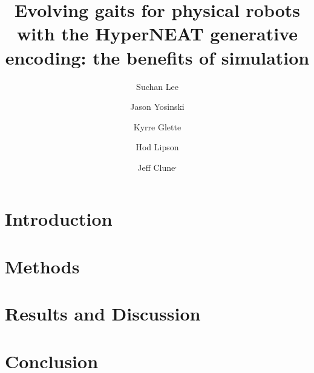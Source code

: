 \documentclass{llncs}
\begin{document}
%
\title{Evolving gaits for physical robots with the HyperNEAT generative encoding: the benefits of simulation}

\author{Suchan Lee \and Jason Yosinski \and Kyrre Glette \and Hod Lipson \and Jeff Clune$^,$ }
\maketitle
%
%
%
%
\begin{abstract}

\end{abstract}
%
%


\section{Introduction}

%
%
\section{Methods}








%
%
\section{Results and Discussion}

%
%
\section{Conclusion}

%
%

%
\footnotesize


%
%
\end{document}
